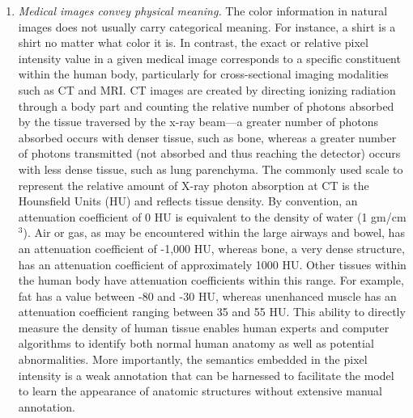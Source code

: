 \begin{enumerate}
    \item \textit{Medical images convey physical meaning.} The color information in natural images does not usually carry categorical meaning. For instance, a shirt is a shirt no matter what color it is. In contrast, the exact or relative pixel intensity value in a given medical image corresponds to a specific constituent within the human body, particularly for cross-sectional imaging modalities such as CT and MRI. CT images are created by directing ionizing radiation through a body part and counting the relative number of photons absorbed by the tissue traversed by the x-ray beam---a greater number of photons absorbed occurs with denser tissue, such as bone, whereas a greater number of photons transmitted (not absorbed and thus reaching the detector) occurs with less dense tissue, such as lung parenchyma. The commonly used scale to represent the relative amount of X-ray photon absorption at CT is the Hounsfield Units (HU) and reflects tissue density. By convention, an attenuation coefficient of 0 HU is equivalent to the density of water (1 gm/cm$^3$). Air or gas, as may be encountered within the large airways and bowel, has an attenuation coefficient of -1,000 HU, whereas bone, a very dense structure, has an attenuation coefficient of approximately 1000 HU. Other tissues within the human body have attenuation coefficients within this range. For example, fat has a value between -80 and -30 HU, whereas unenhanced muscle has an attenuation coefficient ranging between 35 and 55 HU. This ability to directly measure the density of human tissue enables human experts and computer algorithms to identify both normal human anatomy as well as potential abnormalities. More importantly, the semantics embedded in the pixel intensity is a weak annotation that can be harnessed to facilitate the model to learn the appearance of anatomic structures without extensive manual annotation.
    

\end{enumerate}

